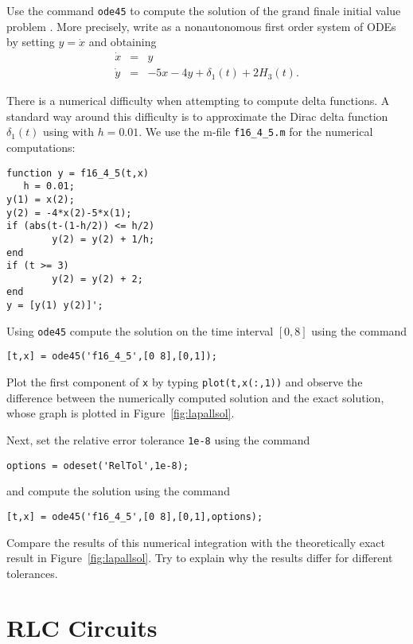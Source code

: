 \documentclass{ximera}
\begin{document}
\begin{exercise} \label{c13.4.5}
Use the \Matlab command {\tt ode45} to compute the solution of the grand 
finale initial value problem .  
More precisely, write  as a nonautonomous first order 
system of ODEs by setting $y=\dot{x}$ and obtaining
\begin{equation*}
\begin{array}{rcl}
\dot{x} & = & y \\
\dot{y} & = & -5x-4y+\delta_1(t)+2H_3(t).
\end{array}
\end{equation*}

There is a numerical difficulty when attempting to compute delta functions. 
A standard way around this difficulty is to approximate the Dirac delta 
function $\delta_1(t)$ using  with $h=0.01$.  We use the 
\Matlab m-file {\tt f16\_4\_5.m} for the numerical computations:
\begin{verbatim}
function y = f16_4_5(t,x)
   h = 0.01;
y(1) = x(2);
y(2) = -4*x(2)-5*x(1);
if (abs(t-(1-h/2)) <= h/2)
        y(2) = y(2) + 1/h;
end
if (t >= 3)
        y(2) = y(2) + 2;
end
y = [y(1) y(2)]';
\end{verbatim}

Using {\tt ode45} compute the solution on the 
time interval $[0,8]$ using the command
\begin{verbatim}
[t,x] = ode45('f16_4_5',[0 8],[0,1]); 
\end{verbatim}
Plot the first component of {\tt x} by typing {\tt plot(t,x(:,1))} and observe 
the difference between the numerically computed solution and the exact 
solution, whose graph is plotted in Figure~\ref{fig:lapallsol}.

Next, set the relative error tolerance {\tt 1e-8} using the command
\begin{verbatim}
options = odeset('RelTol',1e-8);
\end{verbatim}
and compute the solution using the command
\begin{verbatim}
[t,x] = ode45('f16_4_5',[0 8],[0,1],options); 
\end{verbatim}
Compare the results of this numerical integration with the theoretically exact 
result in Figure~\ref{fig:lapallsol}.  Try to explain why the results differ 
for different tolerances.
\end{exercise}


\section{RLC Circuits}  \label{S:SOFE}
\end{document}
